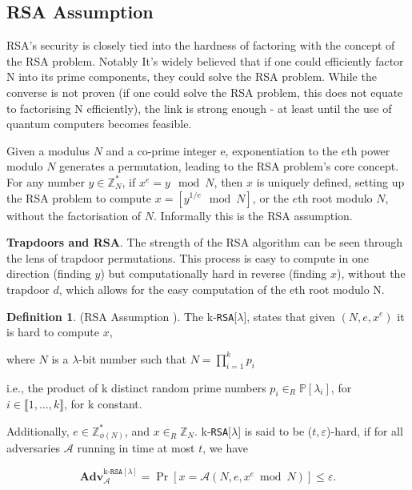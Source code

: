 \documentclass[]{final_report}
\theoremstyle{definition}
\newtheorem{definition}{Definition}[chapter]
\begin{document}
\subsection{RSA Assumption}
\label{subSec:RSA-ASS}
RSA's security is closely tied into the hardness of factoring with the concept of the RSA problem. Notably It's widely believed that if one could efficiently factor N into its prime components, they could solve the RSA problem. While the converse is not proven (if one could solve the RSA problem, this does not equate to factorising N efficiently), the link is strong enough - at least until the use of quantum computers becomes feasible.

Given a modulus \(N\) and a co-prime integer e, exponentiation to the \(e\)th power modulo \(N\) generates a permutation, leading to the RSA problem's core concept. For any number \(y \in \mathbb{Z}^*_{N}\), if \(x^e = y \mod N\), then \(x\) is uniquely defined, setting up the RSA problem to compute \(x = [y^{1/e} \mod N]\), or the \(e\)th root modulo \(N\), without the factorisation of \(N\). Informally this is the RSA assumption.

\textbf{Trapdoors and RSA}. The strength of the RSA algorithm can be seen through the lens of trapdoor permutations. This process is easy to compute in one direction (finding \(y\)) but computationally hard in reverse (finding \(x\)), without the trapdoor \(d\), which allows for the easy computation of the eth root modulo N.

\begin{definition}
\label{def:RSA-ASS}
(RSA Assumption \cite{10.1145/359340.359342}). The k-\texttt{RSA}[$\lambda$], states that given $(N, e, x^e)$ it is hard to compute $x$, 

where $N$ is a $\lambda$-bit number such that $N = \displaystyle\prod_{i=1}^{k} p_i$ 

i.e., the product of k distinct random prime numbers $p_i \in_{R} \mathbb{P}[\lambda_i]$, for $i \in \llbracket1, \ldots, k \rrbracket$, for k constant. 

Additionally, $e \in \mathbb{Z}_{\phi(N)}^{*}$, and $x \in_R \mathbb{Z}_N$. k-\texttt{RSA}[$\lambda$] is said to be ($t, \varepsilon$)-hard, if for all adversaries $ \mathcal{A}$ running in time at most $t$, we have

\[ \textbf{Adv}_ \mathcal{A}^{\text{k-}\texttt{RSA}[\lambda]} = \Pr [x =  \mathcal{A}(N, e, x^e \bmod N) ] \leq \varepsilon. \]
\end{definition}
\end{document}

